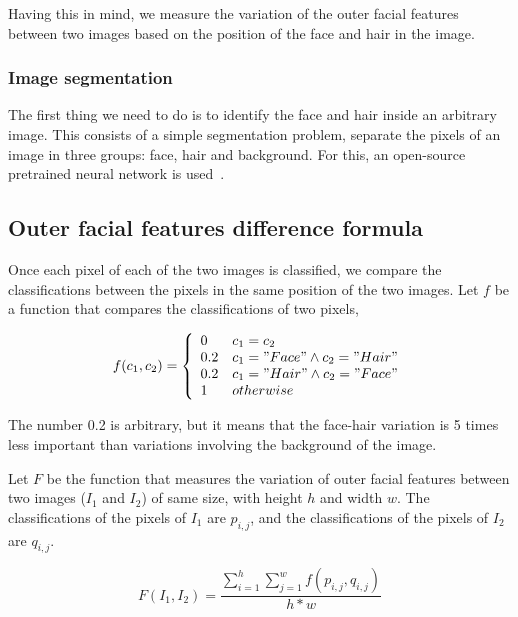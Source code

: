 \documentclass[review]{elsarticle}
\begin{document}
Having this in mind, we measure the variation of the outer facial features between two images based on the position of the face and hair in the image.

\subsubsection{Image segmentation}
The first thing we need to do is to identify the face and hair inside an arbitrary image. This consists of a simple segmentation problem, separate the pixels of an image in three groups: face, hair and background. For this, an open-source pretrained neural network is used~\citep{Gupta_2018}. 

\subsection{Outer facial features difference formula}
\label{subsection:outer_features_difference_formula}

Once each pixel of each of the two images is classified, we compare the classifications between the pixels in the same position of the two images. Let $f$ be a function that compares the classifications of two pixels,

\begin{equation}
f(c_1, c_2) = 
   \left\{
\begin{array}{ll}
      0 & c_1 = c_2 \\
      0.2 & c_1 = "Face" \land c_2 = "Hair" \\
      0.2 & c_1 = "Hair" \land c_2 = "Face" \\
      1 & otherwise \\
\end{array} 
\right. 
\end{equation}

The number 0.2 is arbitrary, but it means that the face-hair variation is 5 times less important than variations involving the background of the image.

Let $F$ be the function that measures the variation of outer facial features between two images ($I_1$ and $I_2$) of same size, with height $h$ and width $w$. The classifications of the pixels of $I_1$ are $p_{i,j}$, and the classifications of the pixels of $I_2$ are $q_{i,j}$.

\begin{equation}
F(I_1, I_2) = \frac{\sum_{i=1}^{h} \sum_{j=1}^{w} f(p_{i,j}, q_{i,j})}{h*w}
\end{equation}
\end{document}
